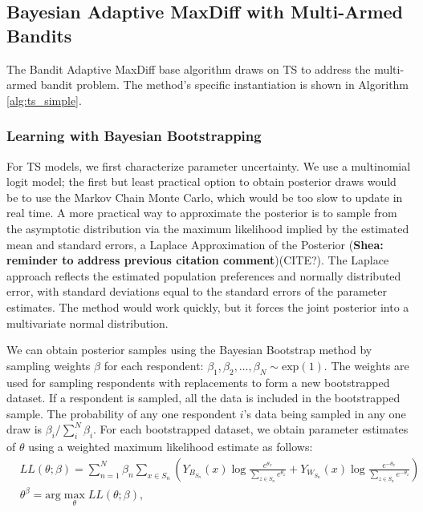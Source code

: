 \documentclass[a4paper,11pt]{article}
\begin{document}

\subsection{Bayesian Adaptive MaxDiff with Multi-Armed Bandits}

The Bandit Adaptive MaxDiff base algorithm draws on TS to address the multi-armed bandit problem. The method's specific instantiation is shown in Algorithm \ref{alg:ts_simple}.
  
\subsubsection{Learning with Bayesian Bootstrapping}

For TS models, we first characterize parameter uncertainty. We use a multinomial logit model; the first but least practical option to obtain posterior draws would be to use the Markov Chain Monte Carlo, which would be too slow to update in real time. A more practical way to approximate the posterior is to sample from the asymptotic distribution via the maximum likelihood implied by the estimated mean and standard errors, a Laplace Approximation of the Posterior (\textbf{Shea: reminder to address previous citation comment})(CITE?). The Laplace approach reflects the estimated population preferences and normally distributed error, with standard deviations equal to the standard errors of the parameter estimates. The method would work quickly, but it forces the joint posterior into a multivariate normal distribution. 

We can obtain posterior samples using the Bayesian Bootstrap method by sampling weights $\beta$ for each respondent: $\beta_1,\beta_2,\ldots,\beta_N \sim \text{exp}(1)$. The weights are used for sampling respondents with replacements to form a new bootstrapped dataset. If a respondent is sampled, all the data is included in the bootstrapped sample. The probability of any one respondent $i$'s data being sampled in any one draw is $\beta_i / \sum_{i}^{N}\beta_i$.  For each bootstrapped dataset, we obtain parameter estimates of $\theta$ using a weighted  maximum likelihood estimate as follows:
\begin{align}
&LL(\theta;\beta)=\sum_{n=1}^N \beta_n
\sum_{x \in S_n} 
	\left(
		Y_{B_{S_n}}(x)
		\log{\frac{e^{\theta_x}}{\sum_{z\in S_n} e^{\theta_z}}} 
		+ 
		Y_{W_{S_n}}(x)
		\log{\frac{e^{-\theta_x}}{\sum_{z\in S_n} e^{-\theta_z}}}
	\right) \\
&\theta^\beta = \text{arg}\max_{\theta} LL(\theta;\beta) ,
\end{align}
\end{document}
